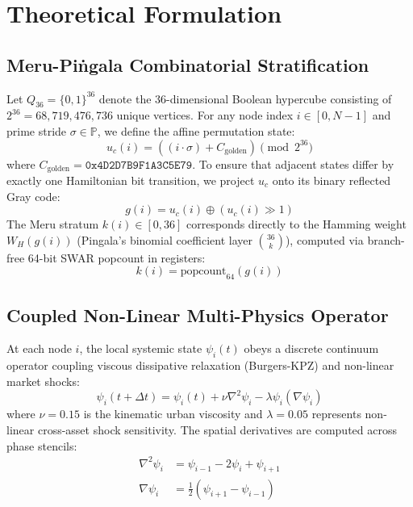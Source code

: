 \documentclass[10pt,twocolumn]{article}
\begin{document}
\section{Theoretical Formulation}

\subsection{Meru-Pi\.{n}gala Combinatorial Stratification}
Let $Q_{36} = \{0, 1\}^{36}$ denote the 36-dimensional Boolean hypercube consisting of $2^{36} = 68,719,476,736$ unique vertices. For any node index $i \in [0, N-1]$ and prime stride $\sigma \in \mathbb{P}$, we define the affine permutation state:
\begin{equation}
u_c(i) = ((i \cdot \sigma) + C_{\text{golden}}) \pmod{2^{36}}
\end{equation}
where $C_{\text{golden}} = \mathtt{0x4D2D7B9F1A3C5E79}$. To ensure that adjacent states differ by exactly one Hamiltonian bit transition, we project $u_c$ onto its binary reflected Gray code:
\begin{equation}
g(i) = u_c(i) \oplus (u_c(i) \gg 1)
\end{equation}
The Meru stratum $k(i) \in [0, 36]$ corresponds directly to the Hamming weight $W_H(g(i))$ (Pingala's binomial coefficient layer $\binom{36}{k}$), computed via branch-free 64-bit SWAR popcount in registers:
\begin{equation}
k(i) = \text{popcount}_{64}(g(i))
\end{equation}

\subsection{Coupled Non-Linear Multi-Physics Operator}
At each node $i$, the local systemic state $\psi_i(t)$ obeys a discrete continuum operator coupling viscous dissipative relaxation (Burgers-KPZ) and non-linear market shocks:
\begin{equation}
\psi_i(t+\Delta t) = \psi_i(t) + \nu \nabla^2 \psi_i - \lambda \psi_i (\nabla \psi_i)
\end{equation}
where $\nu = 0.15$ is the kinematic urban viscosity and $\lambda = 0.05$ represents non-linear cross-asset shock sensitivity. The spatial derivatives are computed across phase stencils:
\begin{align}
\nabla^2 \psi_i &= \psi_{i-1} - 2\psi_i + \psi_{i+1} \\
\nabla \psi_i &= \frac{1}{2}(\psi_{i+1} - \psi_{i-1})
\end{align}
\end{document}
